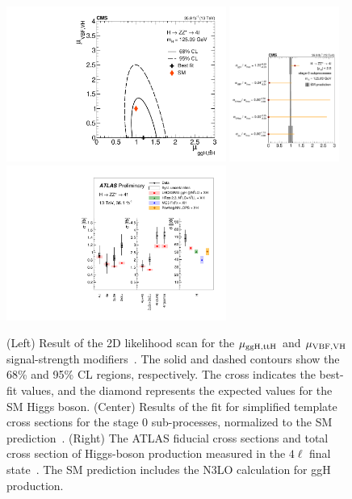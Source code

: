 \documentclass[10pt]{article}
\begin{document}
\begin{figure}[htb]
\centering
\includegraphics[height=2in]{figures/CMS-HIG-16-041_Figure_008-c.pdf}
\includegraphics[height=2in]{figures/CMS-HIG-16-041_Figure_009.pdf}
\includegraphics[height=2in]{figures/ATLAS-HIGG-2016-25__fig_07__xs.pdf}
\caption{
  (Left) Result of the 2D likelihood scan for the ${\rm \mu_{ggH,ttH}}$
  and ${\rm \mu_{VBF,VH}}$ signal-strength modifiers~\cite{CMS:2017jkd}.
  The solid and dashed
  contours show the 68\% and 95\% CL regions, respectively. The cross
  indicates the best-fit values, and the diamond represents the expected
  values for the SM Higgs boson.
  (Center) Results of the fit for simplified template cross sections for
  the stage 0 sub-processes, normalized to the SM prediction~\cite{CMS:2017jkd}.
  (Right) The ATLAS fiducial cross sections and total cross
  section of Higgs-boson production measured in the $4\ell$
  final state~\cite{ATLAS-ZZ}. The SM prediction includes the N3LO
  calculation for ggH production.
}
\label{fig:figure-ZZ-2}
\end{figure}
\end{document}
